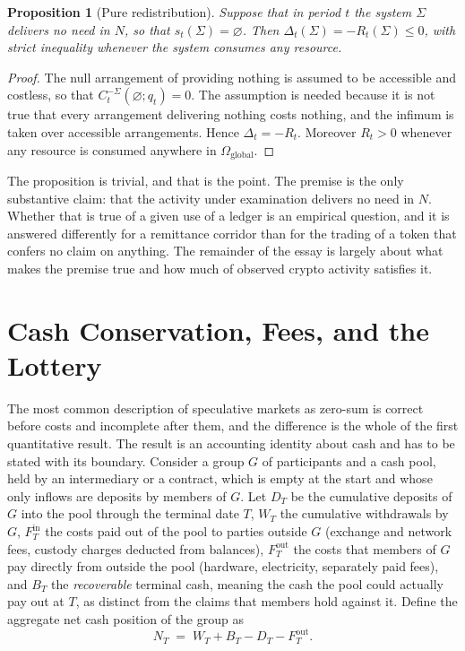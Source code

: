 \documentclass[11pt]{article}
\newtheorem{proposition}{Proposition}
\theoremstyle{remark}
\begin{document}
\begin{proposition}[Pure redistribution]\label{prop:redistribution}
Suppose that in period $t$ the system $\Sigma$ delivers no need in $N$, so that $s_t(\Sigma)=\varnothing$. Then $\Delta_t(\Sigma)=-R_t(\Sigma)\le 0$, with strict inequality whenever the system consumes any resource.
\end{proposition}

\begin{proof}
The null arrangement of providing nothing is assumed to be accessible and costless, so that $C_t^{-\Sigma}(\varnothing;q_t)=0$. The assumption is needed because it is not true that every arrangement delivering nothing costs nothing, and the infimum is taken over accessible arrangements. Hence $\Delta_t=-R_t$. Moreover $R_t>0$ whenever any resource is consumed anywhere in $\Omega_{\mathrm{global}}$.
\end{proof}

The proposition is trivial, and that is the point. The premise is the only substantive claim: that the activity under examination delivers no need in $N$. Whether that is true of a given use of a ledger is an empirical question, and it is answered differently for a remittance corridor than for the trading of a token that confers no claim on anything. The remainder of the essay is largely about what makes the premise true and how much of observed crypto activity satisfies it.

\section{Cash Conservation, Fees, and the Lottery}\label{sec:cash}

The most common description of speculative markets as zero-sum is correct before costs and incomplete after them, and the difference is the whole of the first quantitative result. The result is an accounting identity about cash and has to be stated with its boundary. Consider a group $G$ of participants and a cash pool, held by an intermediary or a contract, which is empty at the start and whose only inflows are deposits by members of $G$. Let $D_T$ be the cumulative deposits of $G$ into the pool through the terminal date $T$, $W_T$ the cumulative withdrawals by $G$, $F^{\mathrm{in}}_T$ the costs paid out of the pool to parties outside $G$ (exchange and network fees, custody charges deducted from balances), $F^{\mathrm{out}}_T$ the costs that members of $G$ pay directly from outside the pool (hardware, electricity, separately paid fees), and $B_T$ the \emph{recoverable} terminal cash, meaning the cash the pool could actually pay out at $T$, as distinct from the claims that members hold against it. Define the aggregate net cash position of the group as
\[
N_T\;=\;W_T+B_T-D_T-F^{\mathrm{out}}_T .
\]
\end{document}
